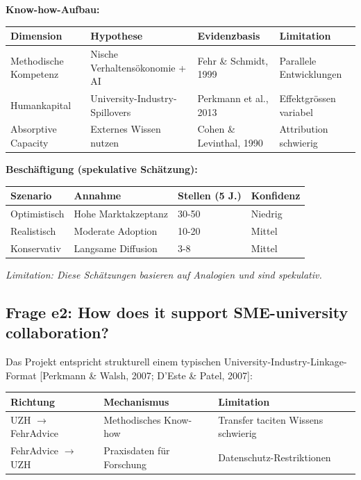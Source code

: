 \documentclass[11pt,a4paper]{article}
\newcommand{\limitation}[1]{\textcolor{limitation}{\textit{Limitation: #1}}}
\newcommand{\evidence}[1]{\textcolor{fehrgray}{[#1]}}
\begin{document}
\textbf{Know-how-Aufbau:}

\begin{table}[h]
\centering
\begin{tabular}{@{}L{3cm}L{4cm}L{3cm}L{3.5cm}@{}}
\toprule
\textbf{Dimension} & \textbf{Hypothese} & \textbf{Evidenzbasis} & \textbf{Limitation} \\
\midrule
Methodische Kompetenz & Nische Verhaltensökonomie + AI & Fehr \& Schmidt, 1999 & Parallele Entwicklungen \\
Humankapital & University-Industry-Spillovers & Perkmann et al., 2013 & Effektgrössen variabel \\
Absorptive Capacity & Externes Wissen nutzen & Cohen \& Levinthal, 1990 & Attribution schwierig \\
\bottomrule
\end{tabular}
\end{table}

\textbf{Beschäftigung (spekulative Schätzung):}

\begin{table}[h]
\centering
\begin{tabular}{@{}L{3.5cm}L{5cm}C{3cm}C{2cm}@{}}
\toprule
\textbf{Szenario} & \textbf{Annahme} & \textbf{Stellen (5 J.)} & \textbf{Konfidenz} \\
\midrule
Optimistisch & Hohe Marktakzeptanz & 30-50 & Niedrig \\
Realistisch & Moderate Adoption & 10-20 & Mittel \\
Konservativ & Langsame Diffusion & 3-8 & Mittel \\
\bottomrule
\end{tabular}
\end{table}

\limitation{Diese Schätzungen basieren auf Analogien und sind spekulativ.}

\subsection{Frage e2: How does it support SME-university collaboration?}

Das Projekt entspricht strukturell einem typischen University-Industry-Linkage-Format \evidence{Perkmann \& Walsh, 2007; D'Este \& Patel, 2007}:

\begin{table}[h]
\centering
\begin{tabular}{@{}L{3cm}L{5cm}L{5.5cm}@{}}
\toprule
\textbf{Richtung} & \textbf{Mechanismus} & \textbf{Limitation} \\
\midrule
UZH $\rightarrow$ FehrAdvice & Methodisches Know-how & Transfer taciten Wissens schwierig \\
FehrAdvice $\rightarrow$ UZH & Praxisdaten für Forschung & Datenschutz-Restriktionen \\
\bottomrule
\end{tabular}
\end{table}
\end{document}
